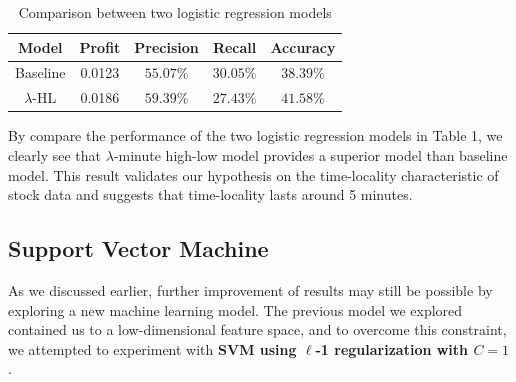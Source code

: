 \documentclass[10pt,twocolumn,letterpaper]{article}
\begin{document}
\begin{table}[H]
\centering
\caption{Comparison between two logistic regression models}
\begin{tabular}{ c|c|c|c|c }
 Model  & Profit & Precision & Recall & Accuracy \\
\hline
\hline
Baseline & 0.0123   &     $55.07\%$  &    $30.05\%$   & $38.39\%$  \\
$\lambda$-HL    &    0.0186     &   $59.39\%$   & $27.43\%$   &  $41.58\%$ \\
\hline
\end{tabular}
\end{table}

By compare the performance of the two logistic regression models in Table 1, we clearly see that $\lambda$-minute high-low model provides a superior model than baseline model. This result validates our hypothesis on the time-locality characteristic of stock data and suggests that time-locality lasts around 5 minutes.

\subsection{Support Vector Machine}
As we discussed earlier, further improvement of results may still be possible by exploring a new machine learning model. The previous model we explored contained us to a low-dimensional feature space, and to overcome this constraint, we attempted to experiment with \textbf{SVM using $\ell$-1 regularization with $C = 1$}.
\end{document}
